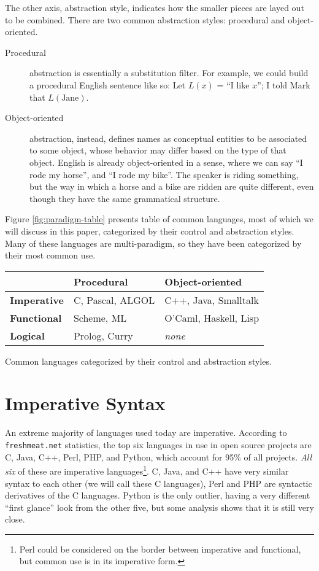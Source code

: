 \documentclass[12pt]{article}
\begin{document}
The other axis, abstraction style, indicates how the smaller pieces are
layed out to be combined.  There are two common abstraction styles:
procedural and object-oriented.

\begin{description}
\item[Procedural] abstraction is essentially a substitution filter.  For
example, we could build a procedural English sentence like so: Let
$\mathit{L}(x)$ = ``I like $x$''; I told Mark that $L(\text{Jane})$.
\item[Object-oriented] abstraction, instead, defines names as conceptual
entities to be associated to some object, whose behavior may differ
based on the type of that object.  English is already object-oriented in
a sense, where we can say ``I rode my horse'', and ``I rode my bike''.
The speaker is riding something, but the way in which a horse and a bike
are ridden are quite different, even though they have the same
grammatical structure.
\end{description}

Figure \ref{fig:paradigm-table} presents table of common languages, most
of which we will discuss in this paper, categorized by their control and
abstraction styles.  Many of these languages are multi-paradigm, so they
have been categorized by their most common use.

\begin{Figure}
\label{fig:paradigm-table}
\begin{tabular}{l|ll}
                      & \textbf{Procedural}  & \textbf{Object-oriented} \\
  \hline
  \textbf{Imperative} & C, Pascal, ALGOL     & C++, Java, Smalltalk \\
  \textbf{Functional} & Scheme, ML           & O'Caml, Haskell, Lisp \\
  \textbf{Logical}    & Prolog, Curry        & \textit{none} \\
\end{tabular}
\caption{Common languages categorized by their control and abstraction
styles.} 
\end{Figure}

\section{Imperative Syntax}

An extreme majority of languages used today are imperative.  According
to \texttt{freshmeat.net} statistics\cite{Welton-2004}, the top six
languages in use in open source projects are C, Java, C++, Perl, PHP,
and Python, which account for 95\% of all projects.  \textit{All six} of
these are imperative languages\footnote{Perl could be considered on the
border between imperative and functional, but common use is in its
imperative form.}.  C, Java, and C++ have very similar syntax to each
other (we will call these C languages), Perl and PHP are syntactic
derivatives of the C languages.  Python is the only outlier, having a
very different ``first glance'' look from the other five, but some
analysis shows that it is still very close.
\end{document}
